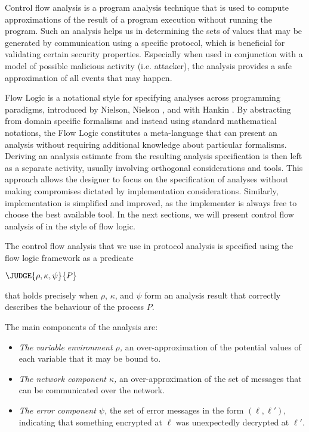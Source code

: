 Control flow analysis is a program analysis technique that is used to
compute approximations of the result of a program execution without
running the program. Such an analysis helps us in determining the sets
of values that may be generated by communication using a specific
protocol, which is beneficial for validating certain security
properties. Especially when used in conjunction with a model of
possible malicious activity (i.e. attacker), the analysis provides a
safe approximation of all events that may happen.

Flow Logic is a notational style for specifying analyses across
programming paradigms, introduced by Nielson, Nielson 
\cite{flow:1,flow:2,flow:3}, and with Hankin
\cite{nie:nie:han}. 
By abstracting from domain
specific formalisms and instead using standard mathematical notations, the Flow
Logic constitutes a meta-language that can present an analysis without requiring
additional knowledge about particular formalisms. Deriving an analysis estimate
from the resulting analysis specification is then left as a separate activity, usually
involving orthogonal considerations and tools.
This approach allows the designer to focus on the specification of analyses without
making compromises dictated by implementation considerations. Similarly,
implementation is simplified and improved, as the implementer is always free to
choose the best available tool. In the next sections, we will present
control flow analysis of \LYSA in the style of flow logic.

The control flow analysis that we use in protocol analysis is specified using the flow logic framework as a predicate
\begin{center}$\JUDGE{\rho, \kappa, \psi}{P}$\end{center}
that holds precisely when $\rho $, $\kappa$, and  $\psi $ form an analysis result that correctly
describes the behaviour of the process $P$. 

The main components of the analysis are:
\begin{itemize}
\item \emph{The variable environment $\rho$,} an over-approximation of the potential values of each variable that it may be bound to.
\item \emph{The network component $\kappa$,} an over-approximation of the set of messages that can be communicated over the network.
\item \emph{The error component $\psi$,} the set of error messages in the form $(\ell,\ell')$, indicating that something encrypted at $\ell$ was unexpectedly decrypted at  $\ell'$.
\end{itemize}



